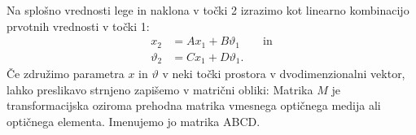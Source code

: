 Na splošno vrednosti lege in naklona v točki 2 izrazimo kot 
linearno kombinacijo prvotnih vrednosti v točki 1:
\begin{align}
 x_2 &= A x_1 + B \vartheta_1 \qquad \mathrm{in}  \label{eq:02_29}\\
 \vartheta_2 &=  C x_1 + D\vartheta_1.
 \label{eq:02_30}
\end{align}
Če združimo parametra $x$ in $\vartheta$ v neki točki prostora
v dvodimenzionalni vektor,
lahko preslikavo strnjeno zapišemo v matrični obliki:
Matrika $M$ je  transformacijska oziroma prehodna matrika 
vmesnega optičnega medija ali optičnega elementa. Imenujemo jo matrika ABCD.

